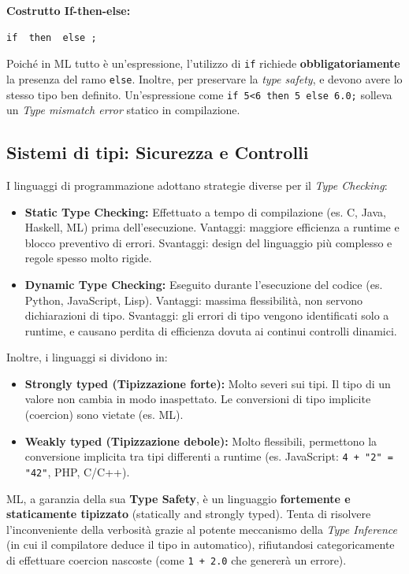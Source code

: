 \documentclass[12pt, a4paper]{article}
\begin{document}
\textbf{Costrutto If-then-else:}
\begin{verbatim}
if  then  else ;
\end{verbatim}
Poiché in ML tutto è un'espressione, l'utilizzo di \texttt{if} richiede \textbf{obbligatoriamente} la presenza del ramo \texttt{else}. Inoltre, per preservare la \textit{type safety}, \texttt{} e \texttt{} devono avere lo stesso tipo ben definito. Un'espressione come \texttt{if 5<6 then 5 else 6.0;} solleva un \textit{Type mismatch error} statico in compilazione.  

\subsection{Sistemi di tipi: Sicurezza e Controlli}
I linguaggi di programmazione adottano strategie diverse per il \textit{Type Checking}:
\begin{itemize}
\item \textbf{Static Type Checking:} Effettuato a tempo di compilazione (es. C, Java, Haskell, ML) prima dell'esecuzione. Vantaggi: maggiore efficienza a runtime e blocco preventivo di errori. Svantaggi: design del linguaggio più complesso e regole spesso molto rigide.
\item \textbf{Dynamic Type Checking:} Eseguito durante l'esecuzione del codice (es. Python, JavaScript, Lisp). Vantaggi: massima flessibilità, non servono dichiarazioni di tipo. Svantaggi: gli errori di tipo vengono identificati solo a runtime, e causano perdita di efficienza dovuta ai continui controlli dinamici.
\end{itemize}  

Inoltre, i linguaggi si dividono in:
\begin{itemize}
\item \textbf{Strongly typed (Tipizzazione forte):} Molto severi sui tipi. Il tipo di un valore non cambia in modo inaspettato. Le conversioni di tipo implicite (coercion) sono vietate (es. ML).
\item \textbf{Weakly typed (Tipizzazione debole):} Molto flessibili, permettono la conversione implicita tra tipi differenti a runtime (es. JavaScript: \texttt{4 + "2" = "42"}, PHP, C/C++).
\end{itemize}
ML, a garanzia della sua \textbf{Type Safety}, è un linguaggio \textbf{fortemente e staticamente tipizzato} (statically and strongly typed). Tenta di risolvere l'inconveniente della verbosità grazie al potente meccanismo della \textit{Type Inference} (in cui il compilatore deduce il tipo in automatico), rifiutandosi categoricamente di effettuare coercion nascoste (come \texttt{1 + 2.0} che genererà un errore).
\end{document}
